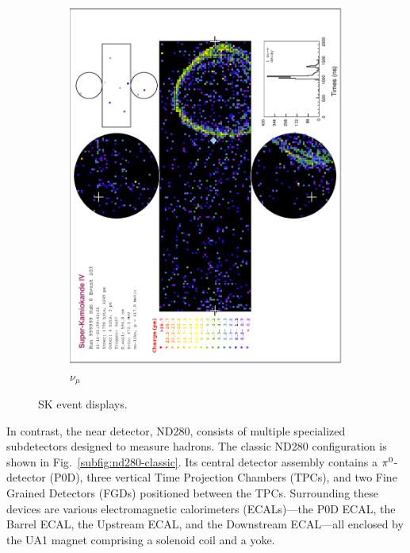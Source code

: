 \begin{figure}
\begin{subfigure}[b]{\dbfigwid\textwidth}
        \includegraphics[width=\textwidth]{figures/t2k/sk-numu.eps}
        \caption{\(\nu_\mu\)}
        \label{subfig:sk-numu}
    \end{subfigure}
    \caption{SK event displays.}
    \label{fig:sk-e-mu}
\end{figure}

In contrast, the near detector, ND280, consists of multiple specialized subdetectors designed to measure hadrons.  
The classic ND280 configuration is shown in Fig.~\ref{subfig:nd280-classic}.  
Its central detector assembly contains a \(\pi^0\)-detector (P0D), three vertical Time Projection Chambers (TPCs), and two Fine Grained Detectors (FGDs) positioned between the TPCs.  
Surrounding these devices are various electromagnetic calorimeters (ECALs)—the P0D ECAL, the Barrel ECAL, the Upstream ECAL, and the Downstream ECAL—all enclosed by the UA1 magnet comprising a solenoid coil and a yoke.


